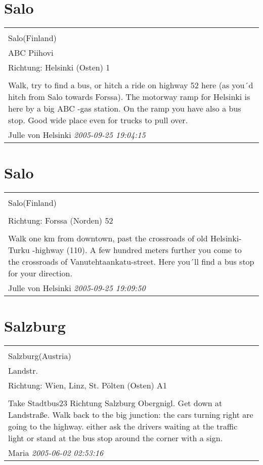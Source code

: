 \documentclass[a4paper,12pt]{article}
\begin{document}
\section{Salo}
\begin{tabular}{|p{13cm}|}
\hline\\
Salo(Finland)\\
ABC Piihovi\\
Richtung: Helsinki (Osten) 1 \\
\hline\\
Walk, try to find a bus, or hitch a ride on highway 52 here (as you´d hitch from Salo towards Forssa). The motorway ramp for Helsinki is here by a big ABC -gas station. On the ramp you have also a bus stop. Good wide place even for trucks to pull over. \\
Julle von Helsinki \textit{ 2005-09-25 19:04:15 }\\\hline
\end{tabular}


\section{Salo}
\begin{tabular}{|p{13cm}|}
\hline\\
Salo(Finland)\\
\\
Richtung: Forssa (Norden) 52 \\
\hline\\
Walk one km from downtown, past the crossroads of old Helsinki-Turku -highway (110). A few hundred meters further you come to the crossroads of Vanutehtaankatu-street. Here you´ll find a bus stop for your direction. \\
Julle von Helsinki \textit{ 2005-09-25 19:09:50 }\\\hline
\end{tabular}


\section{Salzburg}
\begin{tabular}{|p{13cm}|}
\hline\\
Salzburg(Austria)\\
Landstr.\\
Richtung: Wien, Linz, St. Pölten (Osten) A1 \\
\hline\\
Take Stadtbus23 Richtung Salzburg Obergnigl. Get down at Landstraße. Walk back to the big junction: the cars turning right are going to the highway. either ask the drivers waiting at the traffic light or stand at the bus stop around the corner with a sign.
\\
Maria \textit{ 2005-06-02 02:53:16 }\\\hline
\end{tabular}
\end{document}
